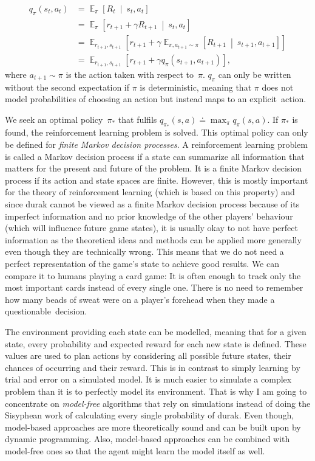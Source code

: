 \documentclass[a4paper,titlepage]{article}
\DeclareMathOperator{\Expectation}{\mathbb{E}}
\newcommand{\Exp}[3]{\Expectation_{#1} \left[ #2 \ \middle| \ #3 \right]}
\newcommand{\Ex}[2]{\Expectation_{#1} \left[ #2 \right]}
\begin{document}
\begin{align*}
  q_\pi(s_t, a_t) &= \Exp{\pi}{R_t}{s_t, a_t} \\
  &= \Exp{\pi}{r_{t+1} + \gamma R_{t + 1}}{s_t, a_t} \\
  &= \Ex{r_{t+1}, s_{t+1}}{r_{t+1} + \gamma \Exp{\pi, a_{t+1} \sim \pi}{R_{t+1}}{s_{t+1}, a_{t+1}}} \\
  &= \Ex{r_{t+1}, s_{t+1}}{r_{t+1} + \gamma q_\pi(s_{t+1}, a_{t+1})},
\end{align*}
where $a_{t+1} \sim \pi$ is the action taken with respect to~$\pi$.
$q_\pi$ can only be written without the second expectation if $\pi$ is deterministic, meaning that $\pi$ does not model probabilities of choosing an action but instead maps to an explicit~action.

We seek an optimal policy~$\pi_*$ that fulfils $q_{\pi_*}(s, a) \doteq \max_\pi q_\pi(s, a)$. If $\pi_*$ is found, the reinforcement learning problem is solved. This optimal policy can only be defined for \emph{finite Markov decision processes}. A reinforcement learning problem is called a Markov decision process if a state can summarize all information that matters for the present and future of the problem. It is a finite Markov decision process if its action and state spaces are finite. However, this is mostly important for the theory of reinforcement learning (which is based on this property) and since durak cannot be viewed as a finite Markov decision process because of its imperfect information and no prior knowledge of the other players' behaviour (which will influence future game states), it is usually okay to not have perfect information as the theoretical ideas and methods can be applied more generally even though they are technically wrong. This means that we do not need a perfect representation of the game's state to achieve good results. We can compare it to humans playing a card game: It is often enough to track only the most important cards instead of every single one. There is no need to remember how many beads of sweat were on a player's forehead when they made a questionable~decision. \medskip

The environment providing each state can be modelled, meaning that for a given state, every probability and expected reward for each new state is defined. These values are used to plan actions by considering all possible future states, their chances of occurring and their reward. This is in contrast to simply learning by trial and error on a simulated model. It is much easier to simulate a complex problem than it is to perfectly model its environment. That is why I am going to concentrate on \emph{model-free} algorithms that rely on simulations instead of doing the Sisyphean work of calculating every single probability of durak. Even though, model-based approaches are more theoretically sound and can be built upon by dynamic programming. Also, model-based approaches can be combined with model-free ones so that the agent might learn the model itself as well.
\end{document}
